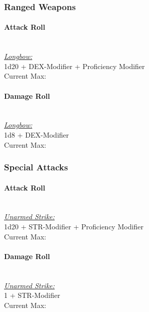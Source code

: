 \documentclass[letterpaper,openany,oneside,twocolumn]{book}
\begin{document}
\subsubsection*{Ranged Weapons}
\paragraph*{Attack Roll}\hfill\\
\underline{\textit{Longbow:}}\\
1d20 + DEX-Modifier + Proficiency Modifier\\
\indent Current Max: 
\paragraph*{Damage Roll}\hfill\\
\underline{\textit{Longbow:}}\\
1d8 + DEX-Modifier\\
\indent Current Max: 
\subsubsection*{Special Attacks}
\paragraph*{Attack Roll}\hfill\\
\underline{\textit{Unarmed Strike:}}\\
1d20 + STR-Modifier + Proficiency Modifier\\
\indent Current Max: 
\paragraph*{Damage Roll}\hfill\\
\underline{\textit{Unarmed Strike:}}\\
1 + STR-Modifier\\
\indent Current Max: 
\end{document}
